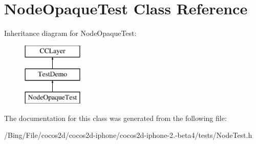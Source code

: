 \hypertarget{interface_node_opaque_test}{\section{Node\-Opaque\-Test Class Reference}
\label{interface_node_opaque_test}
}
Inheritance diagram for Node\-Opaque\-Test\-:\begin{figure}[H]
\begin{center}
\leavevmode
\includegraphics[height=3.000000cm]{interface_node_opaque_test}
\end{center}
\end{figure}


The documentation for this class was generated from the following file\-:\begin{DoxyCompactItemize}
\item 
/\-Bing/\-File/cocos2d/cocos2d-\/iphone/cocos2d-\/iphone-\/2.-\/beta4/tests/Node\-Test.\-h\end{DoxyCompactItemize}
